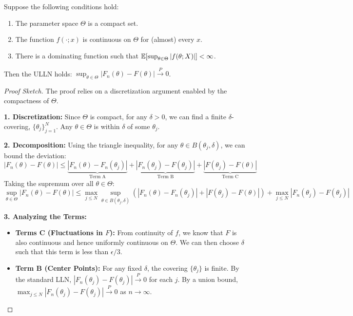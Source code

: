 \begin{thm}
Suppose the following conditions hold:
\begin{enumerate}
    \item The parameter space $\Theta$ is a compact set.
    \item The function $f(\cdot; x)$ is continuous on $\Theta$ for (almost) every $x$.
    \item There is a dominating function such that $\mathbb{E}[\sup_{\theta \in \Theta} |f(\theta; X)|] < \infty$.
\end{enumerate}
Then the ULLN holds: $\sup_{\theta \in \Theta} |F_n(\theta) - F(\theta)| \xrightarrow{P} 0$.
\end{thm}
\begin{proof}[Proof Sketch]
The proof relies on a discretization argument enabled by the compactness of $\Theta$.

\textbf{1. Discretization:} Since $\Theta$ is compact, for any $\delta > 0$, we can find a finite $\delta$-covering, $\{\theta_j\}_{j=1}^N$. Any $\theta \in \Theta$ is within $\delta$ of some $\theta_j$.

\textbf{2. Decomposition:} Using the triangle inequality, for any $\theta \in B(\theta_j, \delta)$, we can bound the deviation:
$$ |F_n(\theta) - F(\theta)| \le \underbrace{|F_n(\theta) - F_n(\theta_j)|}_{\text{Term A}} + \underbrace{|F_n(\theta_j) - F(\theta_j)|}_{\text{Term B}} + \underbrace{|F(\theta_j) - F(\theta)|}_{\text{Term C}} $$
Taking the supremum over all $\theta \in \Theta$:
$$ \sup_{\theta \in \Theta} |F_n(\theta) - F(\theta)| \le \max_{j \le N} \sup_{\theta \in B(\theta_j, \delta)} \left( |F_n(\theta) - F_n(\theta_j)| + |F(\theta_j) - F(\theta)| \right) + \max_{j \le N} |F_n(\theta_j) - F(\theta_j)| $$

\textbf{3. Analyzing the Terms:}
\begin{itemize}
    \item \textbf{Terms C (Fluctuations in $F$):} From continuity of $f$, we know that $F$ is also continuous and hence uniformly continuous on $\Theta$. We can then choose $\delta$ such that this term is less than $\epsilon/3$.
    \item \textbf{Term B (Center Points):} For any fixed $\delta$, the covering $\{\theta_j\}$ is finite. By the standard LLN, $|F_n(\theta_j) - F(\theta_j)| \xrightarrow{P} 0$ for each $j$. By a union bound, $\max_{j \le N} |F_n(\theta_j) - F(\theta_j)| \xrightarrow{P} 0$ as $n \to \infty$.
    

\end{itemize}
\end{proof}
